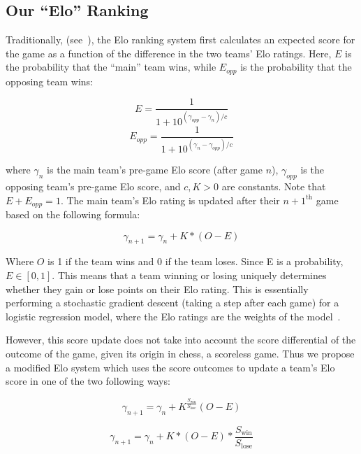 \documentclass{article}
\begin{document}
\subsection{Our ``Elo'' Ranking}
Traditionally, (see~\cite{mediumRatingSystem}), the Elo ranking system first calculates an expected score for the game as a function of the difference in the two teams' Elo ratings. Here, $E$ is the probability that the ``main'' team wins, while $E_{opp}$ is the probability that the opposing team wins:

\begin{equation}\label{eq:E}
E = \frac{1}{1+10^{(\gamma_{opp}-\gamma_n)/c}}
\end{equation}
\begin{equation}\label{eq:E}
E_{opp} = \frac{1}{1+10^{(\gamma_n-\gamma_{opp})/c}}
\end{equation}

where $\gamma_n$ is the main team's pre-game Elo score (after game $n$), $\gamma_{opp}$ is the opposing team's pre-game Elo score, and $c, K > 0$ are constants. Note that $E + E_{opp} = 1$. The main team's Elo rating is updated after their $n+1^{\text{th}}$ game based on the following formula:

\begin{equation}
\gamma_{n+1} = \gamma_n + K*(O - E)
\end{equation}


Where $O$ is 1 if the team wins and 0 if the team loses. Since E is a probability,  $E \in [0, 1]$. This means that a team winning or losing uniquely determines whether they gain or lose points on their Elo rating. This is essentially performing a stochastic gradient descent (taking a step after each game) for a logistic regression model, where the Elo ratings are the weights of the model~\cite{stmorseStatisticalLearning}.

However, this score update does not take into account the score differential of the outcome of the game, given its origin in chess, a scoreless game. Thus we propose a modified Elo system which uses the score outcomes to update a team's Elo score in one of the two following ways: 

\begin{equation}
\label{exponentialUpdate}
\gamma_{n+1} = \gamma_n + K^{\frac{S_{\text{win}}}{S_{\text{lose}}}}(O - E)
\end{equation}


\begin{equation}
\label{multiplyUpdate}
\gamma_{n+1} = \gamma_n + K*(O - E)*\frac{S_{\text{win}}}{S_{\text{lose}}}
\end{equation}
\end{document}
